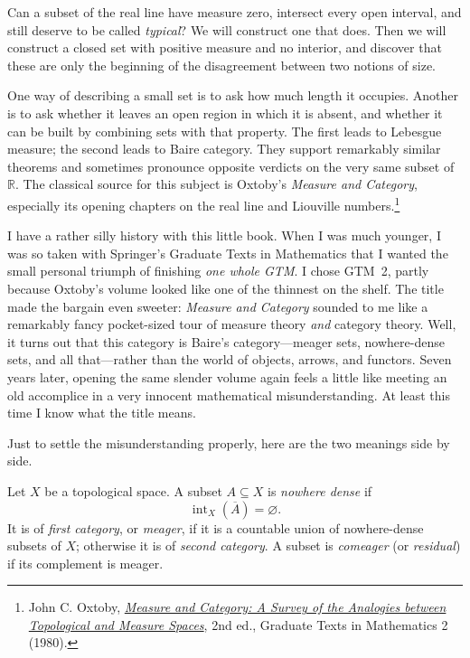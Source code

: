 
Can a subset of the real line have measure zero, intersect every open interval, and still deserve to be called \emph{typical}? We will construct one that does. Then we will construct a closed set with positive measure and no interior, and discover that these are only the beginning of the disagreement between two notions of size.

One way of describing a small set is to ask how much length it occupies. Another is to ask whether it leaves an open region in which it is absent, and whether it can be built by combining sets with that property. The first leads to Lebesgue measure; the second leads to Baire category. They support remarkably similar theorems and sometimes pronounce opposite verdicts on the very same subset of \(\mathbb R\). The classical source for this subject is Oxtoby's \emph{Measure and Category}, especially its opening chapters on the real line and Liouville numbers.\footnote{John C. Oxtoby, \href{https://link.springer.com/book/10.1007/978-1-4684-9339-9}{\emph{Measure and Category: A Survey of the Analogies between Topological and Measure Spaces}}, 2nd ed., Graduate Texts in Mathematics 2 (1980).}

I have a rather silly history with this little book. When I was much younger, I was so taken with Springer's Graduate Texts in Mathematics that I wanted the small personal triumph of finishing \emph{one whole GTM}. I chose GTM~2, partly because Oxtoby's volume looked like one of the thinnest on the shelf. The title made the bargain even sweeter: \emph{Measure and Category} sounded to me like a remarkably fancy pocket-sized tour of measure theory \emph{and} category theory. Well, it turns out that this category is Baire's category---meager sets, nowhere-dense sets, and all that---rather than the world of objects, arrows, and functors. Seven years later, opening the same slender volume again feels a little like meeting an old accomplice in a very innocent mathematical misunderstanding. At least this time I know what the title means.

Just to settle the misunderstanding properly, here are the two meanings side by side.

\begin{definition}
Let \(X\) be a topological space. A subset \(A\subseteq X\) is \emph{nowhere dense} if
\[
 \operatorname{int}_X(\overline A)=\varnothing.
\]
It is of \emph{first category}, or \emph{meager}, if it is a countable union of nowhere-dense subsets of \(X\); otherwise it is of \emph{second category}. A subset is \emph{comeager} (or \emph{residual}) if its complement is meager.
\end{definition}

